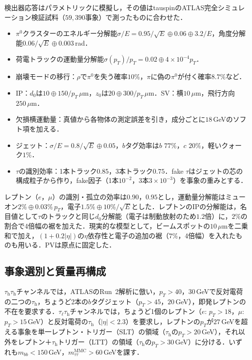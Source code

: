 \documentclass[paper=a4,fontsize=10pt,jafontsize=10pt,line_length=44zw,number_of_lines=46]{jlreq}
\newcommand{\tauh}{\tau_{\mathrm{h}}}
\newcommand{\taul}{\tau_{\ell}}
\begin{document}
検出器応答はパラメトリックに模擬し，その値はtauspinのATLAS完全シミュレーション検証試料（$59{,}390$事象）で測ったものに合わせた．
\begin{itemize}
  \item $\pi^0$クラスターのエネルギー分解能$\sigma/E=0.95/\sqrt E\oplus0.06\oplus3.2/E$，角度分解能$0.06/\sqrt E\oplus0.003$\,rad．
  \item 荷電トラックの運動量分解能$\sigma(p_T)/p_T=0.02\oplus4\times10^{-4}p_T$．
  \item 崩壊モードの移行：$\rho$で$\pi^0$を失う確率$10\%$，$\pi$に偽の$\pi^0$が付く確率$8.7\%$など．
  \item IP：$d_0$は$10\oplus150/p_T\,\mu$m，$z_0$は$20\oplus300/p_T\,\mu$m．SV：横$10\,\mu$m，飛行方向$250\,\mu$m．
  \item 欠損横運動量：真値から各物体の測定誤差を引き，成分ごとに$18$\,GeVのソフト項を加える．
  \item ジェット：$\sigma/E=0.8/\sqrt E\oplus0.05$，$b$タグ効率は$b$ $77\%$，$c$ $20\%$，軽いクォーク$1\%$．
  \item $\tau$の識別効率：1本トラック$0.85$，3本トラック$0.75$．fake $\tau$はジェットの芯の構成粒子から作り，fake因子（1本$10^{-2}$，3本$3\times10^{-3}$）を事象の重みとする．
\end{itemize}
レプトン（$e$，$\mu$）の識別・孤立の効率は$0.90$，$0.95$とし，運動量分解能はミューオン$2\%\oplus0.03\%\,p_T$，電子$1.5\%\oplus10\%/\sqrt E$とした．レプトンのIPの分解能は，名目値として$\tau$のトラックと同じ$d_0$分解能（電子は制動放射のため$1.2$倍）に，$2\%$の割合で4倍幅の裾を加えた．現実的な模型として，ビームスポットの$10\,\mu$mを二乗和で加え，$(1+0.2|\eta|)$の$\eta$依存性と電子の追加の裾（$7\%$，4倍幅）を入れたものも用いる．PVは原点に固定した．

\subsection{事象選別と質量再構成}

$\tauh\tauh$チャンネルでは，ATLASのRun~2解析\cite{ATLAS:2022xzm}に倣い，$p_T>40$，$30$\,GeVで反対電荷の二つの$\tauh$，ちょうど2本の$b$タグジェット（$p_T>45$，$20$\,GeV），即発レプトンの不在を要求する．$\taul\tauh$チャンネルでは，ちょうど1個のレプトン（$e$: $p_T>18$，$\mu$: $p_T>15$\,GeV）と反対電荷の$\tauh$（$|\eta|<2.3$）を要求し，レプトンの$p_T$が$27$\,GeVを超える事象を単一レプトン・トリガー（SLT）の領域（$\tauh$の$p_T>20$\,GeV），それ以外をレプトン＋$\tauh$トリガー（LTT）の領域（$\tauh$の$p_T>30$\,GeV）に分ける．いずれも$m_{bb}<150$\,GeV，$m_{\tau\tau}^{\mathrm{MMC}}>60$\,GeVを課す．
\end{document}
